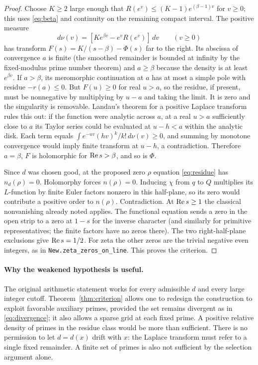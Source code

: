 \documentclass[11pt,a4paper]{article}
\theoremstyle{remark}\newtheorem{remark}[theorem]{Remark}
\begin{document}
\begin{proof}
Choose $K\ge2$ large enough that $R(e^v)\le (K-1)e^{(\beta-1)v}$ for $v\ge0$; this uses \eqref{eq:beta} and continuity on the remaining compact interval. The positive measure
\[d\nu(v)=[Ke^{\beta v}-e^vR(e^v)]\,dv\qquad(v\ge0)\]
has transform $F(s)=K/(s-\beta)-\Phi(s)$ far to the right. Its abscissa of convergence $a$ is finite (the smoothed remainder is bounded at infinity by the fixed-modulus prime number theorem) and $a\ge\beta$ because the density is at least $e^{\beta v}$. If $a>\beta$, its meromorphic continuation at $a$ has at most a simple pole with residue $-r(a)\le0$. But $F(u)\ge0$ for real $u>a$, so the residue, if present, must be nonnegative by multiplying by $u-a$ and taking the limit. It is zero and the singularity is removable. Landau's theorem for a positive Laplace transform rules this out: if the function were analytic across $a$, at a real $u>a$ sufficiently close to $a$ its Taylor series could be evaluated at $u-h<a$ within the analytic disk. Each term equals $\int e^{-uv}(hv)^k/k!\,d\nu(v)\ge0$, and summing by monotone convergence would imply finite transform at $u-h$, a contradiction. Therefore $a=\beta$, $F$ is holomorphic for $\operatorname{Re} s>\beta$, and so is $\Phi$.

Since $d$ was chosen good, at the proposed zero $\rho$ equation \eqref{eq:residue} has $n_d(\rho)=0$. Holomorphy forces $n(\rho)=0$. Inducing $\chi$ from $q$ to $Q$ multiplies its $L$-function by finite Euler factors nonzero in this half-plane, so its zero would contribute a positive order to $n(\rho)$. Contradiction. At $\operatorname{Re} s\ge1$ the classical nonvanishing already noted applies. The functional equation sends a zero in the open strip to a zero at $1-s$ for the inverse character (and similarly for primitive representatives; the finite factors have no zeros there). The two right-half-plane exclusions give $\operatorname{Re} s=1/2$. For zeta the other zeros are the trivial negative even integers, as in \texttt{New.zeta\_zeros\_on\_line}. This proves the criterion.
\end{proof}

\paragraph{Why the weakened hypothesis is useful.} The original arithmetic statement works for every admissible $d$ and every large integer cutoff. Theorem~\ref{thm:criterion} allows one to redesign the construction to exploit favorable auxiliary primes, provided the set remains divergent as in \eqref{eq:divergence}; it also allows a sparse grid at each fixed prime. A positive relative density of primes in the residue class would be more than sufficient. There is no permission to let $d=d(x)$ drift with $x$: the Laplace transform must refer to a single fixed remainder. A finite set of primes is also not sufficient by the selection argument alone.
\end{document}
